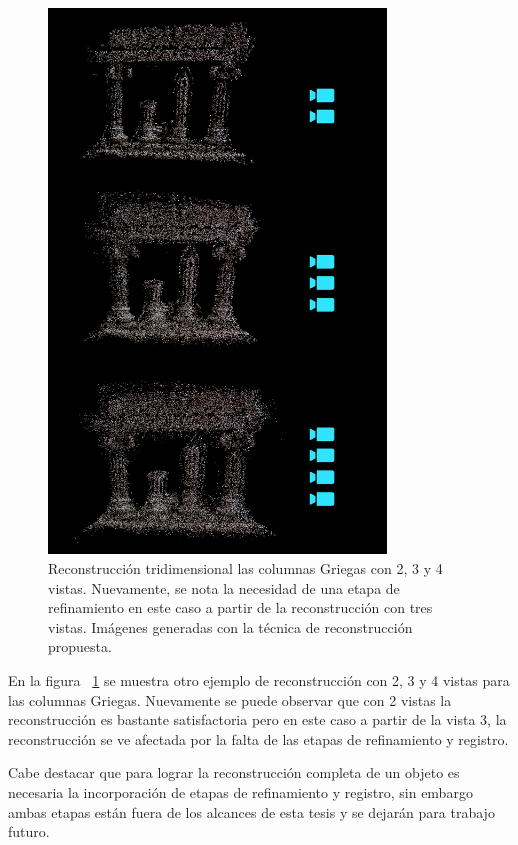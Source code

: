 \begin{figure}[H]
\centering
\includegraphics[width=0.8\textwidth]{images/greek234.png}
\caption[Reconstrucci\'{o}n de las columnas Griegas con 2, 3 y 4 vistas]%
{Reconstrucci\'{o}n tridimensional las columnas Griegas con 2, 3 y 4 vistas. Nuevamente, se nota la necesidad de una etapa de refinamiento en este caso a partir de la reconstrucci\'{o}n con tres vistas. Im\'{a}genes generadas con la t\'{e}cnica de reconstrucción propuesta.}
\label{fig:Greek234}
\end{figure}


En la figura ~\ref{fig:Greek234} se muestra otro ejemplo de reconstrucci\'{o}n con 2, 3 y 4 vistas para las columnas Griegas. Nuevamente se puede observar que con 2 vistas la reconstrucci\'{o}n es bastante satisfactoria pero en este caso a partir de la vista 3, la reconstrucci\'{o}n se ve afectada por la falta de las etapas de refinamiento y registro.

Cabe destacar que para lograr la reconstrucci\'{o}n completa de un objeto es necesaria la incorporaci\'{o}n de etapas de refinamiento y registro, sin embargo ambas etapas est\'{a}n fuera de los alcances de esta tesis y se dejar\'{a}n para trabajo futuro.



